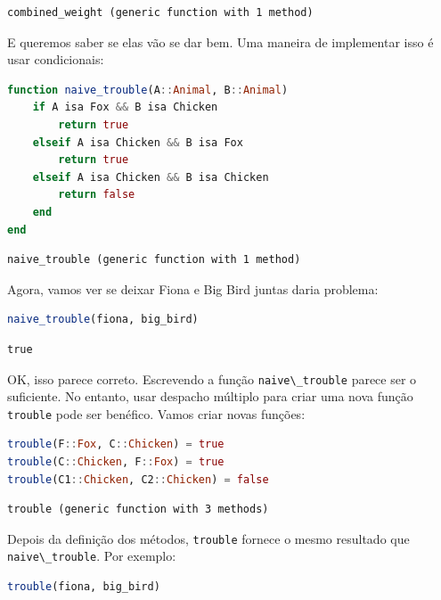 \documentclass[
  notoc %
]{tufte-book}
\newcommand{\passthrough}[1]{#1}
\begin{document}
\begin{lstlisting}[language=Output]
combined_weight (generic function with 1 method)
\end{lstlisting}

E queremos saber se elas vão se dar bem. Uma maneira de implementar isso
é usar condicionais:

\begin{lstlisting}[language=Julia]
function naive_trouble(A::Animal, B::Animal)
    if A isa Fox && B isa Chicken
        return true
    elseif A isa Chicken && B isa Fox
        return true
    elseif A isa Chicken && B isa Chicken
        return false
    end
end
\end{lstlisting}

\begin{lstlisting}[language=Output]
naive_trouble (generic function with 1 method)
\end{lstlisting}

Agora, vamos ver se deixar Fiona e Big Bird juntas daria problema:

\begin{lstlisting}[language=Julia]
naive_trouble(fiona, big_bird)
\end{lstlisting}

\begin{lstlisting}[language=Output]
true
\end{lstlisting}

OK, isso parece correto. Escrevendo a função
\passthrough{\lstinline!naive\_trouble!} parece ser o suficiente. No
entanto, usar despacho múltiplo para criar uma nova função
\passthrough{\lstinline!trouble!} pode ser benéfico. Vamos criar novas
funções:

\begin{lstlisting}[language=Julia]
trouble(F::Fox, C::Chicken) = true
trouble(C::Chicken, F::Fox) = true
trouble(C1::Chicken, C2::Chicken) = false
\end{lstlisting}

\begin{lstlisting}[language=Output]
trouble (generic function with 3 methods)
\end{lstlisting}

Depois da definição dos métodos, \passthrough{\lstinline!trouble!}
fornece o mesmo resultado que \passthrough{\lstinline!naive\_trouble!}.
Por exemplo:

\begin{lstlisting}[language=Julia]
trouble(fiona, big_bird)
\end{lstlisting}
\end{document}
